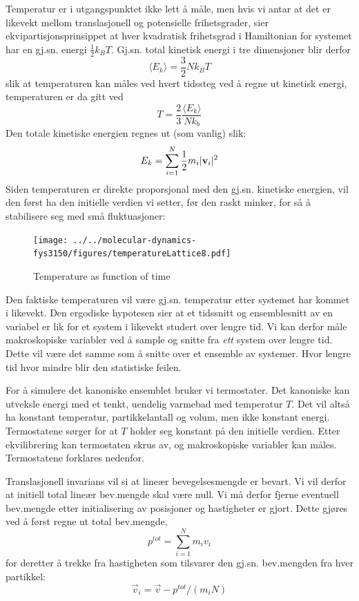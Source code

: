 \documentclass[english, a4paper]{article}
\begin{document}
Temperatur er i utgangspunktet ikke lett å måle, men hvis vi antar at det er likevekt mellom
translasjonell og potensielle frihetsgrader, sier ekvipartisjonsprinsippet at hver
kvadratisk frihetsgrad i Hamiltonian for systemet har en gj.sn. energi $\frac{1}{2}k_BT$. 
Gj.sn. total kinetisk energi i tre dimensjoner blir derfor
\begin{equation}
 \langle E_k \rangle = \frac{3}{2}Nk_BT
\end{equation}
slik at temperaturen kan måles ved hvert tidssteg ved å regne ut kinetisk energi,
temperaturen er da gitt ved
\begin{equation}
 T = \frac{2}{3} \frac{\langle E_k \rangle}{Nk_b}
\end{equation}
Den totale kinetiske energien regnes ut (som vanlig) slik:
\begin{equation}
 E_k = \sum_{i=1}^N \frac{1}{2}m_i|{\bf v}_i|^2
\end{equation}
Siden temperaturen er direkte proporsjonal med den gj.sn. kinetiske energien, vil den først ha
den initielle verdien vi setter, før den raskt minker, for så å stabilisere seg med små fluktuasjoner:
\begin{figure}[H]
\begin{center}
  \texttt{[image: ../../molecular-dynamics-fys3150/figures/temperatureLattice8.pdf]}
  \caption{Temperature as function of time}\label{fig:fig2}
  \end{center}
\end{figure}
Den faktiske temperaturen vil være gj.sn. temperatur etter systemet har kommet i likevekt.
Den ergodiske hypotesen sier at et tidssnitt og ensemblesnitt av en variabel er lik for et 
system i likevekt studert over lengre tid. Vi kan derfor måle makroskopiske variabler
ved å sample og snitte fra \textit{ett} system over lengre tid. Dette vil være det samme
som å snitte over et ensemble av systemer. Hvor lengre tid hvor mindre blir
den statistiske feilen.

\noindent


\noindent
For å simulere det kanoniske ensemblet bruker vi termostater. Det kanoniske kan utveksle energi
med et tenkt, uendelig varmebad med temperatur $T$. Det vil altså ha konstant temperatur, 
partikkelantall og volum, men ikke konstant energi. Termostatene sørger for at $T$ holder seg
konstant på den initielle verdien. Etter ekvilibrering kan termostaten skrus av, og 
makroskopiske variabler kan måles. Termostatene forklares nedenfor. 

Translasjonell invarians vil si at lineær bevegelsesmengde er bevart. Vi vil derfor 
at initiell total lineær bev.mengde skal være null. Vi må derfor fjerne eventuell
bev.mengde etter initialisering av posisjoner og hastigheter er gjort. Dette gjøres ved å
først regne ut total bev.mengde,
\begin{equation}
 p^{tot} = \sum_{i=1}^N m_i v_i
\end{equation}
for deretter å trekke fra hastigheten som tilsvarer den gj.sn. bev.mengden fra hver partikkel:
\begin{equation}
 \vec{v}_i = \vec{v} - p^{tot} / (m_i N)
\end{equation}
\end{document}
